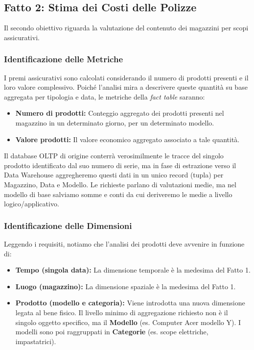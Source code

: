\subsection{Fatto 2: Stima dei Costi delle Polizze}

Il secondo obiettivo riguarda la valutazione del contenuto dei magazzini per scopi assicurativi.

\subsubsection{Identificazione delle Metriche}
I premi assicurativi sono calcolati considerando il numero di prodotti presenti e il loro valore complessivo.
Poiché l'analisi mira a descrivere queste quantità su base aggregata per tipologia e data, le metriche della \textit{fact table} saranno:
\begin{itemize}
    \item \textbf{Numero di prodotti:} Conteggio aggregato dei prodotti presenti nel magazzino in un determinato giorno, per un determinato modello.
    \item \textbf{Valore prodotti:} Il valore economico aggregato associato a tale quantità.
\end{itemize}
Il database OLTP di origine conterrà verosimilmente le tracce del singolo prodotto identificato dal suo numero di serie, ma in fase di estrazione verso il Data Warehouse aggregheremo questi dati in un unico record (tupla) per Magazzino, Data e Modello. Le richieste parlano di valutazioni medie, ma nel modello di base salviamo somme e conti da cui deriveremo le medie a livello logico/applicativo.

\subsubsection{Identificazione delle Dimensioni}
Leggendo i requisiti, notiamo che l'analisi dei prodotti deve avvenire in funzione di:
\begin{itemize}
    \item \textbf{Tempo (singola data):} La dimensione temporale è la medesima del Fatto 1.
    \item \textbf{Luogo (magazzino):} La dimensione spaziale è la medesima del Fatto 1.
    \item \textbf{Prodotto (modello e categoria):} Viene introdotta una nuova dimensione legata al bene fisico. Il livello minimo di aggregazione richiesto non è il singolo oggetto specifico, ma il \textbf{Modello} (es. Computer Acer modello Y). I modelli sono poi raggruppati in \textbf{Categorie} (es. scope elettriche, impastatrici).
\end{itemize}

